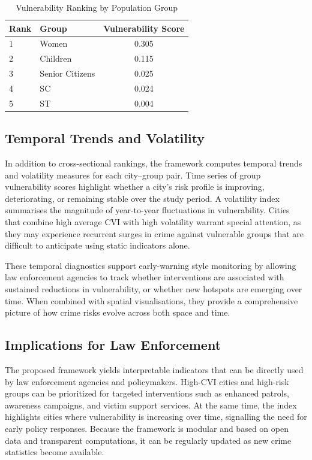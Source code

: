\documentclass[conference]{IEEEtran}
\begin{document}
\begin{table}[htbp]
\caption{Vulnerability Ranking by Population Group}
\label{tab:group_vulnerability}
\centering
\small
\begin{tabular}{l l c}
\toprule
\textbf{Rank} & \textbf{Group} & \textbf{Vulnerability Score} \\
\midrule
1 & Women           & 0.305 \\
2 & Children        & 0.115 \\
3 & Senior Citizens & 0.025 \\
4 & SC              & 0.024 \\
5 & ST              & 0.004 \\
\bottomrule
\end{tabular}
\end{table}

\subsection{Temporal Trends and Volatility}
In addition to cross-sectional rankings, the framework computes temporal trends and volatility measures for each city--group pair. Time series of group vulnerability scores highlight whether a city's risk profile is improving, deteriorating, or remaining stable over the study period. A volatility index summarises the magnitude of year-to-year fluctuations in vulnerability. Cities that combine high average CVI with high volatility warrant special attention, as they may experience recurrent surges in crime against vulnerable groups that are difficult to anticipate using static indicators alone.

These temporal diagnostics support early-warning style monitoring by allowing law enforcement agencies to track whether interventions are associated with sustained reductions in vulnerability, or whether new hotspots are emerging over time. When combined with spatial visualisations, they provide a comprehensive picture of how crime risks evolve across both space and time.

\subsection{Implications for Law Enforcement}
The proposed framework yields interpretable indicators that can be directly used by law enforcement agencies and policymakers. High-CVI cities and high-risk groups can be prioritized for targeted interventions such as enhanced patrols, awareness campaigns, and victim support services. At the same time, the index highlights cities where vulnerability is increasing over time, signalling the need for early policy responses. Because the framework is modular and based on open data and transparent computations, it can be regularly updated as new crime statistics become available.
\end{document}
